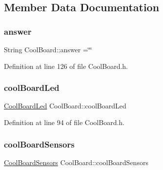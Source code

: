 \subsection{Member Data Documentation}
\mbox{\label{class_cool_board_a7b835fafd449e5282f7f91d787a2dc15}} 
\subsubsection{\texorpdfstring{answer}{answer}}
{\footnotesize\ttfamily String Cool\+Board\+::answer =\char`\"{}\char`\"{}\hspace{0.3cm}{\ttfamily [private]}}



Definition at line 126 of file Cool\+Board.\+h.

\mbox{\label{class_cool_board_a1b1d3c684a5baa56b08486e192fd8e97}} 
\subsubsection{\texorpdfstring{cool\+Board\+Led}{coolBoardLed}}
{\footnotesize\ttfamily \hyperlink{class_cool_board_led}{Cool\+Board\+Led} Cool\+Board\+::cool\+Board\+Led\hspace{0.3cm}{\ttfamily [private]}}



Definition at line 94 of file Cool\+Board.\+h.

\mbox{\label{class_cool_board_af102be5288bd7f7a8e59b13f86e26a00}} 
\subsubsection{\texorpdfstring{cool\+Board\+Sensors}{coolBoardSensors}}
{\footnotesize\ttfamily \hyperlink{class_cool_board_sensors}{Cool\+Board\+Sensors} Cool\+Board\+::cool\+Board\+Sensors\hspace{0.3cm}{\ttfamily [private]}}



